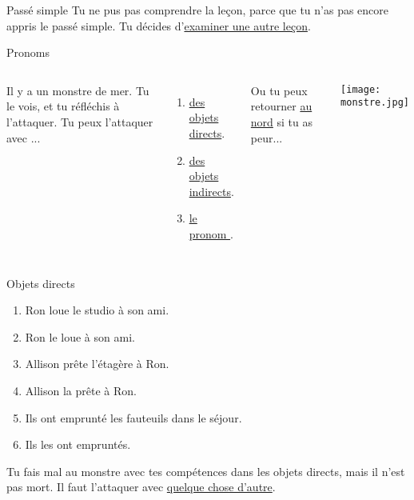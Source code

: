 \documentclass{beamer}
\begin{document}
  \begin{frame}{Passé simple}
    \hypertarget{simple}{}
    Tu ne \alert{pus} pas comprendre la leçon, parce que tu n'as pas encore appris le passé simple.
    Tu décides d'\hyperlink{passé}{examiner une autre leçon}.
  \end{frame}

  \begin{frame}{Pronoms}
    \hypertarget{pronoms}{}
    \begin{columns}
        Il y a un monstre de mer.
        Tu le vois, et tu réfléchis à l'attaquer.
        Tu peux l'attaquer avec ...
        \begin{enumerate}
          \item \hyperlink{direct}{des objets directs}.
          \item \hyperlink{indirect}{des objets indirects}.
          \item \hyperlink{y}{le pronom }.
        \end{enumerate}
        Ou tu peux retourner \hyperlink{début}{au nord} si tu as peur...
        \begin{center}
          \texttt{[image: monstre.jpg]}
        \end{center}
    \end{columns}
  \end{frame}

  \begin{frame}{Objets directs}
    \hypertarget{direct}{}
    \begin{enumerate}
      \item Ron loue \alert<2->{le studio} à son ami.
      \item<3->[$\to$] Ron \alert{le} loue à son ami.
      \item<4-> Allison prête \alert<5->{l'étagère} à Ron.
      \item<6->[$\to$] Allison \alert{la} prête à Ron.
      \item<7-> Ils ont emprunté \alert<8->{les fauteuils dans le séjour}.
      \item<9->[$\to$] Ils \alert{les} ont emprunté\alert{s}.
    \end{enumerate}
    Tu fais mal  au monstre avec tes compétences dans les objets directs, mais il n'est pas mort.
    Il faut l'attaquer avec \hyperlink{pronoms}{quelque chose d'autre}.
  \end{frame}
\end{document}
